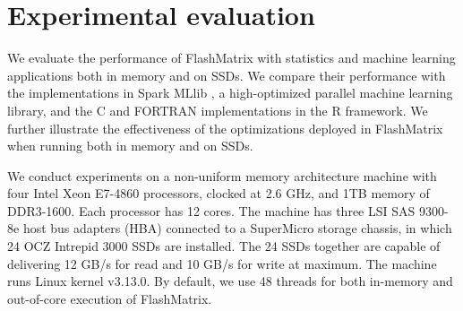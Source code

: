 \section{Experimental evaluation}
We evaluate the performance of FlashMatrix with statistics and machine learning
applications both in memory and on SSDs. We compare their performance with
the implementations in Spark MLlib \cite{mllib}, a high-optimized parallel
machine learning library, and the C and FORTRAN implementations in the R framework.
We further illustrate the effectiveness of the optimizations deployed in
FlashMatrix when running both in memory and on SSDs.

We conduct experiments on a non-uniform memory architecture machine with
four Intel Xeon E7-4860 processors, clocked at 2.6 GHz, and 1TB memory of
DDR3-1600. Each processor has 12 cores. The machine has three LSI SAS 9300-8e
host bus adapters (HBA) connected to a SuperMicro storage chassis, in which
24 OCZ Intrepid 3000 SSDs are installed. The 24 SSDs together are capable of
delivering 12 GB/s for read and 10 GB/s for write at maximum. The machine runs
Linux kernel v3.13.0. By default, we use 48 threads for both in-memory and
out-of-core execution of FlashMatrix.

